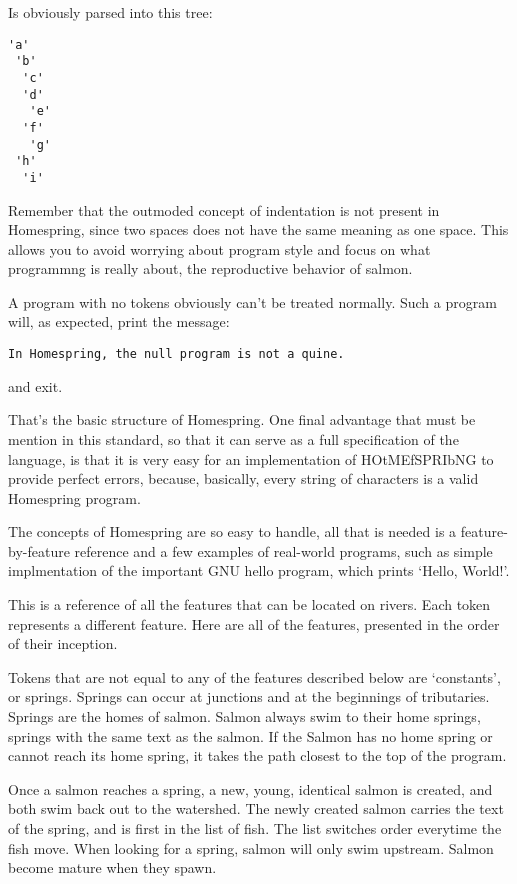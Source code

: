 \documentclass[10pt]{article}
\begin{document}
Is obviously parsed into this tree:

\begin{verbatim}
'a'
 'b'
  'c'
  'd'
   'e'
  'f'
   'g'
 'h'
  'i'
\end{verbatim}

Remember that the outmoded concept of indentation is not present in Homespring, since two spaces does not have the same meaning as one space. This allows you to avoid worrying about program style and focus on what programmng is really about, the reproductive behavior of salmon.

A program with no tokens obviously can't be treated normally. Such a program will, as expected, print the message:

\begin{verbatim}
In Homespring, the null program is not a quine.
\end{verbatim}

and exit.


That's the basic structure of Homespring. One final advantage that must be mention in this standard, so that it can serve as a full specification of the language, is that it is very easy for an implementation of HOtMEfSPRIbNG to provide perfect errors, because, basically, every string of characters is a valid Homespring program.


The concepts of Homespring are so easy to handle, all that is needed is a feature-by-feature reference and a few examples of real-world programs, such as simple implmentation of the important GNU hello program, which prints `Hello, World!'.


This is a reference of all the features that can be located on rivers. Each token represents a different feature. Here are all of the features, presented in the order of their inception.


Tokens that are not equal to any of the features described below are `constants', or springs. Springs can occur at junctions and at the beginnings of tributaries. Springs are the homes of salmon. Salmon always swim to their home springs, springs with the same text as the salmon. If the Salmon has no home spring or cannot reach its home spring, it takes the path closest to the top of the program.

Once a salmon reaches a spring, a new, young, identical salmon is created, and both swim back out to the watershed. The newly created salmon carries the text of the spring, and is first in the list of fish. The list switches order everytime the fish move. When looking for a spring, salmon will only swim upstream. Salmon become mature when they spawn.
\end{document}
